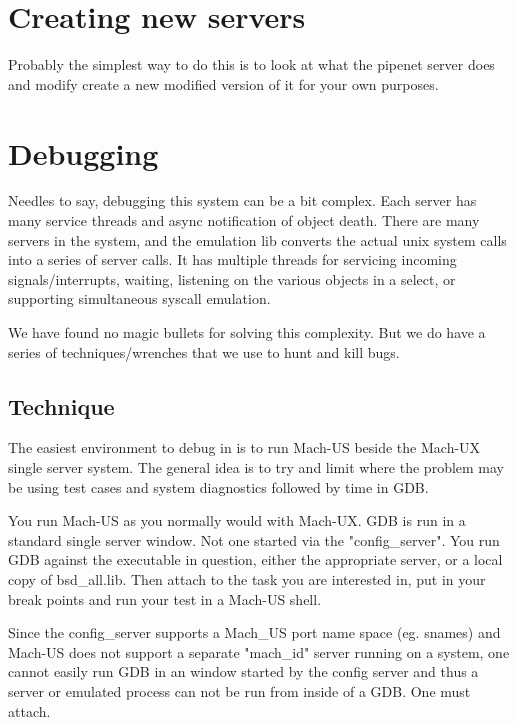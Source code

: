 \section{Creating new servers}
Probably the simplest way to do this is to look at what the pipenet
server does and modify create a new modified version of it
for your own purposes.
{\MORE}

\section{Debugging}
Needles to say, debugging this system can be a bit complex.  Each server
has many service threads and async notification of object death.
There are many servers in the system, and the
emulation lib converts the actual unix system calls into a series of server
calls.  It has multiple threads for servicing 
incoming signals/interrupts,  waiting, listening on the various objects
in a select, or supporting simultaneous syscall emulation.

We have found no magic bullets for solving this complexity.  But we do have
a series of techniques/wrenches that we use to hunt and kill bugs.

\subsection{Technique}
\label{sec:debug-technique}
The easiest environment to debug in is to run Mach-US beside the Mach-UX
single server system.
The general idea is to try and limit where the problem may be using
test cases and system diagnostics followed by time in GDB.

You run Mach-US as you normally would with Mach-UX.
GDB is run in a standard single server window.  Not one started via
the "config\_server".  You run GDB against the executable in question,
either the appropriate server, or a local copy of bsd\_all.lib.  Then
attach to the task you are interested in, put in
your break points and run your test in a Mach-US shell.

Since the config\_server supports a Mach\_US port name space (eg. snames) and
Mach-US does not support a separate
"mach\_id" server running on a system,  one
cannot easily run GDB in an window started by the config server and thus
a server or emulated process can not be run from inside of a GDB.  One must
attach.

